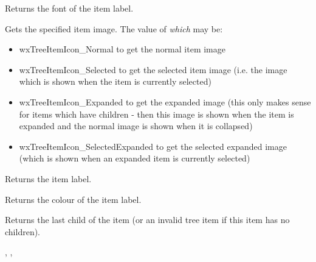 Returns the font of the item label.


\label{wxtreectrlgetitemimage}


Gets the specified item image. The value of {\it which} may be:

\begin{itemize}\itemsep=0pt
\item{wxTreeItemIcon\_Normal} to get the normal item image
\item{wxTreeItemIcon\_Selected} to get the selected item image (i.e. the image
which is shown when the item is currently selected)
\item{wxTreeItemIcon\_Expanded} to get the expanded image (this only
makes sense for items which have children - then this image is shown when the
item is expanded and the normal image is shown when it is collapsed)
\item{wxTreeItemIcon\_SelectedExpanded} to get the selected expanded image
(which is shown when an expanded item is currently selected)
\end{itemize}


\label{wxtreectrlgetitemtext}


Returns the item label.


\label{wxtreectrlgetitemtextcolour}


Returns the colour of the item label.


\label{wxtreectrlgetlastchild}


Returns the last child of the item (or an invalid tree item if this item has no children).


,
,


\label{wxtreectrlgetnextchild}

